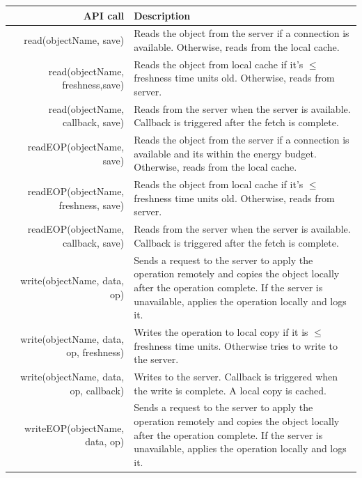 \begin{table}
\begin{center}
  \begin{tabular}{| r | p{9cm}  | }
    \hline
    {\bf API call } & {\bf Description }  \\ \hline
    read(objectName, save) & Reads the object from the server if a connection is available.  Otherwise, reads from the local cache. \\ \hline
    read(objectName, freshness,save) & Reads the object from local cache if it's $\leq$ freshness time units old.  Otherwise, reads from server. \\ \hline
    read(objectName, callback, save) & Reads from the server when the server is available.  Callback is triggered after the fetch is complete. \\ \hline
    readEOP(objectName, save) & Reads the object from the server if a connection is available and its within the energy budget.  Otherwise, reads from the local cache. \\ \hline
    readEOP(objectName, freshness, save) & Reads the object from local cache if it's $\leq$ freshness time units old.  Otherwise, reads from server. \\ \hline
    readEOP(objectName, callback, save) & Reads from the server when the server is available.  Callback is triggered after the fetch is complete. \\ \hline
    write(objectName, data, op) & Sends a request to the server to apply the operation remotely and copies the object locally after the operation complete.  If the server is unavailable, applies the operation locally and logs it. \\ \hline
    write(objectName, data, op, freshness) & Writes the operation to local copy if it is $\leq$ freshness time units.  Otherwise tries to write to the server. \\ \hline
    write(objectName, data, op, callback) & Writes to the server.  Callback is triggered when the write is complete.  A local copy is cached. \\
    \hline
    writeEOP(objectName, data, op) & Sends a request to the server to apply the operation remotely and copies the object locally after the operation complete.  If the server is unavailable, applies the operation locally and logs it. \\ \hline

\end{tabular}
\end{center}
\end{table}
